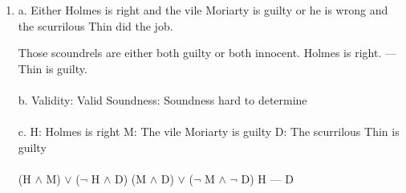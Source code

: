 \documentclass[]{article}
\begin{document}
\begin{enumerate}
    \item a.
    \newline Either Holmes is right and the vile Moriarty is guilty or he is wrong and the scurrilous Thin did the job.
    \newline
    
    Those scoundrels are either both guilty or both innocent.
    \newline
    Holmes is right.
    \newline
    ---
    \newline
    Thin is guilty.
    \\\\b.
    Validity: Valid
    \newline
    Soundness: Soundness hard to determine
    \\\\c.
    \newline H: Holmes is right
    \newline M: The vile Moriarty is guilty
    \newline D: The scurrilous Thin is guilty
    \\\\ (H $\land$ M) $\lor$ ($\neg$ H $\land$ D)
    \newline (M $\land$ D) $\lor$ ($\neg$ M $\land$  $\neg$ D)
    \newline H
    \newline ---
    \newline D
    

\end{enumerate}
\end{document}
